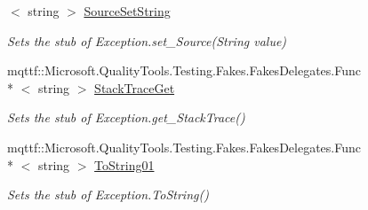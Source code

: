 \begin{DoxyCompactItemize}
$<$ string $>$ \hyperlink{class_system_1_1_component_model_1_1_fakes_1_1_stub_invalid_asynchronous_state_exception_a0417907649866e676b8d30c83db7d68f}{Source\-Set\-String}
\begin{DoxyCompactList}\small\item\em Sets the stub of Exception.\-set\-\_\-\-Source(\-String value)\end{DoxyCompactList}\item 
mqttf\-::\-Microsoft.\-Quality\-Tools.\-Testing.\-Fakes.\-Fakes\-Delegates.\-Func\\*
$<$ string $>$ \hyperlink{class_system_1_1_component_model_1_1_fakes_1_1_stub_invalid_asynchronous_state_exception_a64fa5774aaa733437e9cba01bd1bcfc0}{Stack\-Trace\-Get}
\begin{DoxyCompactList}\small\item\em Sets the stub of Exception.\-get\-\_\-\-Stack\-Trace()\end{DoxyCompactList}\item 
mqttf\-::\-Microsoft.\-Quality\-Tools.\-Testing.\-Fakes.\-Fakes\-Delegates.\-Func\\*
$<$ string $>$ \hyperlink{class_system_1_1_component_model_1_1_fakes_1_1_stub_invalid_asynchronous_state_exception_acade0d8133e1490a3c74ba3c42279f9d}{To\-String01}
\begin{DoxyCompactList}\small\item\em Sets the stub of Exception.\-To\-String()\end{DoxyCompactList}\end{DoxyCompactItemize}
